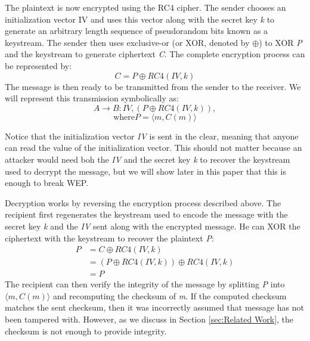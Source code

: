 \documentclass[11pt, twocolumn]{article} %
\begin{document}
The plaintext is now encrypted using the RC4 cipher.  The sender chooses an initialization vector IV and uses this vector along with the secret key \textit{k} to generate an arbitrary length sequence of pseudorandom bits known as a keystream.  The sender then uses exclusive-or (or XOR, denoted by $\oplus$) to XOR \textit{P} and the keystream to generate ciphertext \textit{C}.  The complete encryption process can be represented by: 
$$C = P \oplus RC4(IV, k)$$
The message is then ready to be transmitted from the sender to the receiver.  We will represent this transmission symbolically as:
$$A \rightarrow B: IV, (P \oplus RC4(IV, k)),$$
$$ \text{where} P = \langle m, C(m) \rangle$$ 

Notice that the initialization vector \textit{IV} is sent in the clear, meaning that anyone can read the value of the initialization vector.  This should not matter because an attacker would need boh the \textit{IV} and the secret key \textit{k} to recover the keystream used to decrypt the message, but we will show later in this paper that this is enough to break WEP.

Decryption works by reversing the encryption process described above.  The recipient first regenerates the keystream used to encode the message with the secret key \textit{k} and the \textit{IV} sent along with the encrypted message.  He can XOR the ciphertext with the keystream to recover the plaintext \textit{P}:
\begin{align*}
P &= C \oplus RC4(IV, k)\\
\nonumber &= (P \oplus RC4(IV, k)) \oplus RC4(IV, k)\\
\nonumber &= P
\end{align*}
The recipient can then verify the integrity of the message by splitting \textit{P} into $\langle m, C(m) \rangle$ and recomputing the checksum of \textit{m}.  If the computed checksum matches the sent checksum, then it was incorrectly assumed that message has not been tampered with.   However, as we discuss in Section \ref{sec:Related Work}, the checksum is not enough to provide integrity. 
\end{document}
